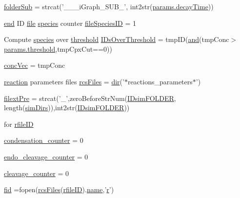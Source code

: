 \begin{DoxyCompactItemize}
\item 
\hyperlink{a00022_a05c5bf0305e5d58d4dc25bd89a025678}{folder\-Sub} = strcat('\-\_\-\-\_\-\_\-i\-Graph\-\_\-\-S\-U\-B\-\_\-', int2str(\hyperlink{a00030_afb6aa83fb78c663f3b39be2380842a8b}{params.\-decay\-Time}))
\item 
\hyperlink{a00019_afb358f48b1646c750fb9da6c6585be2b}{end} I\-D \hyperlink{a00062_a4e8353d6c62cf54bf4a1a8f63e56b8c3}{file} \hyperlink{a00016}{species} counter \hyperlink{a00022_aac959c2e94c26a03fa03966f9cec127e}{file\-Species\-I\-D} = 1
\item 
Compute \hyperlink{a00016}{species} over \hyperlink{a00030_aa022cbb28f80299d572def08e7a5ccfd}{threshold} \hyperlink{a00022_a67c695f856b6731644c6a128e602a323}{I\-Ds\-Over\-Threshold} = tmp\-I\-D(\hyperlink{a00022_a170f8acb213f91bf71c77b1d20bceb33}{and}(tmp\-Conc$>$\hyperlink{a00030_aa022cbb28f80299d572def08e7a5ccfd}{params.\-threshold},tmp\-Cpx\-Cut==0))
\item 
\hyperlink{a00022_a5cb5865443d8f156213280c070385e0d}{conc\-Vec} = tmp\-Conc
\item 
\hyperlink{a00022_a4ba2ecb46f808729569ecce2cc1d34c6}{reaction} parameters files \hyperlink{a00022_aa7a414dad4901fc05688608a49adfd7e}{rcs\-Files} = \hyperlink{a00065_a4ca269cf93df1b512b52174c1a256fe5}{dir}('$\ast$reactions\-\_\-parameters$\ast$')
\item 
\hyperlink{a00022_a527736a425f4f7ead2c2dc9d7b479346}{filext\-Pre} = strcat('\-\_\-',zero\-Before\-Str\-Num(\hyperlink{a00022_aeef3e34bd64eec758eac16f004cdcef0}{I\-Dsim\-F\-O\-L\-D\-E\-R}, length(\hyperlink{a00025_aae5035eb84b89176ed5b06e136325eff}{sim\-Dirs})),int2str(\hyperlink{a00022_aeef3e34bd64eec758eac16f004cdcef0}{I\-Dsim\-F\-O\-L\-D\-E\-R}))
\item 
for \hyperlink{a00022_a2773ef160060ce8adead229154219112}{rfile\-I\-D}
\item 
\hyperlink{a00022_adad395e0a0c736c2818d52c1100d4f31}{condensation\-\_\-counter} = 0
\item 
\hyperlink{a00022_aac101310701750e7d113b83271c1b982}{endo\-\_\-cleavage\-\_\-counter} = 0
\item 
\hyperlink{a00022_ab1f4c307f0935bb99adb3036a2936b5e}{cleavage\-\_\-counter} = 0
\item 
\hyperlink{a00022_ae9011d40c6f13e68e6f07156e0da7c5d}{fid} =fopen(\hyperlink{a00022_aa7a414dad4901fc05688608a49adfd7e}{rcs\-Files}(\hyperlink{a00022_a2773ef160060ce8adead229154219112}{rfile\-I\-D}).\hyperlink{a00021_abbf559a76fab59203496b0847ab9502a}{name},'\hyperlink{a00025_ac862e7284527eb913b1351c8bfb8e079}{r}')

\end{DoxyCompactItemize}
